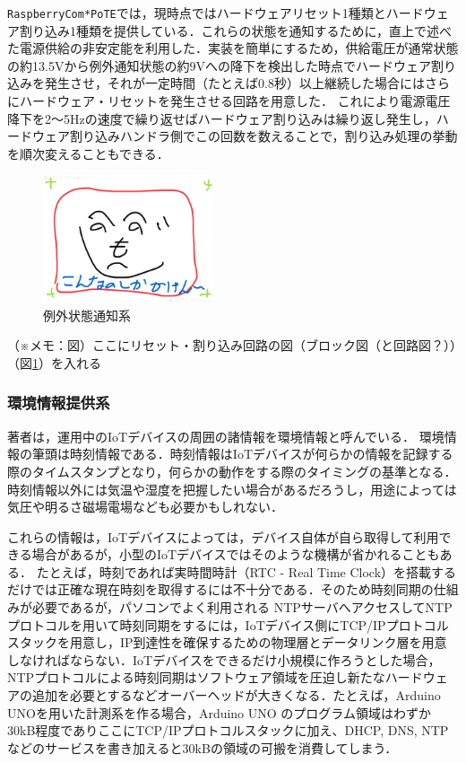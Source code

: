  {\tt Raspberry\-Com*PoTE}では，現時点ではハードウェアリセット1種類とハードウェア割り込み1種類を提供している．これらの状態を通知するために，直上で述べた電源供給の非安定能を利用した．実装を簡単にするため，供給電圧が通常状態の約13.5Vから例外通知状態の約9Vへの降下を検出した時点でハードウェア割り込みを発生させ，それが一定時間（たとえば0.8秒）以上継続した場合にはさらにハードウェア・リセットを発生させる回路を用意した．
これにより電源電圧降下を2〜5Hzの速度で繰り返せばハードウェア割り込みは繰り返し発生し，ハードウェア割り込みハンドラ側でこの回数を数えることで，割り込み処理の挙動を順次変えることもできる．

\begin{figure}[H]
\centering
\includegraphics[width=5cm]{figspics/henoheno.jpeg}
\caption{例外状態通知系}
\label{hohno:RaspberryComPoTE-E}
\end{figure}


（※メモ：図）ここにリセット・割り込み回路の図（ブロック図（と回路図？））（図\ref{hohno:RaspberryComPoTE-E}）を入れる



\subsubsection{環境情報提供系}


著者は，運用中のIoTデバイスの周囲の諸情報を環境情報と呼んでいる．
環境情報の筆頭は時刻情報である．時刻情報はIoTデバイスが何らかの情報を記録する際のタイムスタンプとなり，何らかの動作をする際のタイミングの基準となる．
時刻情報以外には気温や湿度を把握したい場合があるだろうし，用途によっては気圧や明るさ磁場電場なども必要かもしれない．

これらの情報は，IoTデバイスによっては，デバイス自体が自ら取得して利用できる場合があるが，小型のIoTデバイスではそのような機構が省かれることもある．
たとえば，時刻であれば実時間時計（RTC - Real Time Clock）を搭載するだけでは正確な現在時刻を取得するには不十分である．そのため時刻同期の仕組みが必要であるが，パソコンでよく利用される NTPサーバへアクセスしてNTPプロトコルを用いて時刻同期をするには，IoTデバイス側にTCP/IPプロトコルスタックを用意し，IP到達性を確保するための物理層とデータリンク層を用意しなければならない．IoTデバイスをできるだけ小規模に作ろうとした場合，NTPプロトコルによる時刻同期はソフトウェア領域を圧迫し新たなハードウェアの追加を必要とするなどオーバーヘッドが大きくなる．たとえば，Arduino UNOを用いた計測系を作る場合，Arduino UNO のプログラム領域はわずか 30kB程度でありここにTCP/IPプロトコルスタックに加え、DHCP, DNS, NTP などのサービスを書き加えると30kBの領域の可搬を消費してしまう．



